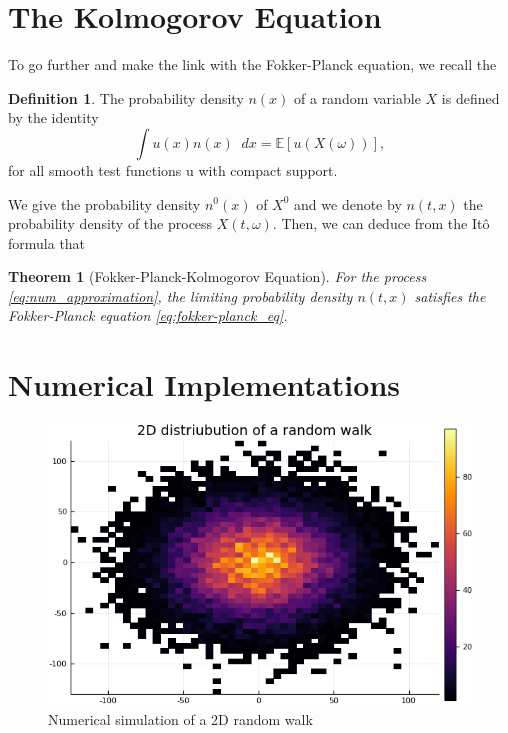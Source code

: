 \documentclass{article}
\newcommand{\E}[1]{\mathbb{E}\left[ #1 \right]}
\newcommand{\diff}{\mathop{}\!d}
\theoremstyle{definition}
\newtheorem{defn}{Definition}[section]
\theoremstyle{plain}
\newtheorem{thm}{Theorem}[section]
\theoremstyle{remark}
\begin{document}
\section{The Kolmogorov Equation}
To go further and make the link with the Fokker-Planck equation, we recall the
\begin{defn}
	The probability density $ n(x) $ of a random variable $ X $ is defined by the identity
	\[\int u(x)n(x)\diff x=\E{u(X(\omega))}, \]
	for all smooth test functions u with compact support.
\end{defn} 

We give the probability density $ n^0(x) $ of $ X^0 $ and we denote by $ n(t,x) $ the probability density of the process $ X(t,\omega) $. Then, we can deduce from the It\^o formula that 
\begin{thm}[Fokker-Planck-Kolmogorov Equation]
	For the process \eqref{eq:num_approximation}, the 	limiting probability density $ n(t,x) $ satisfies the Fokker-Planck equation \eqref{eq:fokker-planck_eq}.
\end{thm}



\section{Numerical Implementations}
\begin{figure}
	\centering
	\includegraphics[width=.7\textwidth]{Code/Julia/Im/rw.png}
	\caption[2D simulation random walk]{Numerical simulation of a 2D random walk}
\end{figure}


\nocite{tuckerman2010statistical}
\nocite{perthame2015parabolic}
\nocite{salsa2016equazioni}
\printbibliography
\end{document}

